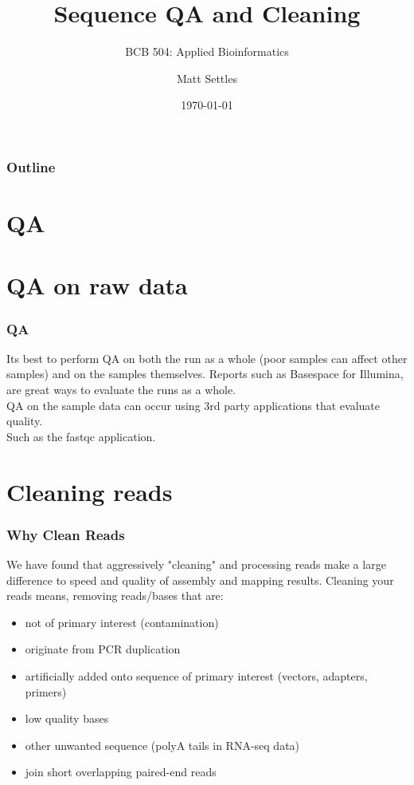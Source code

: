 \documentclass[pdf]{beamer}
\begin{document}
\title[Sequence Mapping]{Sequence QA and Cleaning}
\subtitle{BCB 504: Applied Bioinformatics\\}
\author[Matt Settles]{Matt Settles}
\date{\today}


\begin{frame}[plain]
  \titlepage
\end{frame}


\begin{frame}[plain] 
  \frametitle{Outline}
  \tableofcontents
\end{frame}

\section{QA}
\section{QA on raw data}
\begin{frame}
\frametitle{QA}
Its best to perform QA on both the run as a whole (poor samples can affect other samples) and on the samples themselves. Reports such as Basespace for Illumina,  are great ways to evaluate the runs as a whole.\\
\vspace{0.2in}
QA on the sample data can occur using 3rd party applications that evaluate quality.\\
Such as the fastqc application.\\
\end{frame}


\section{Cleaning reads}

\begin{frame}
\frametitle{Why Clean Reads}
We have found that aggressively "cleaning" and processing reads make a large difference to speed and quality of assembly and mapping results.
\vspace{0.2in}
Cleaning your reads means, removing reads/bases that are:
\begin{itemize}
\item not of primary interest (contamination)
\item originate from PCR duplication
\item artificially added onto sequence of primary interest (vectors, adapters, primers)
\item low quality bases
\item other unwanted sequence (polyA tails in RNA-seq data)
\item join short overlapping paired-end reads
\end{itemize}

\end{frame}
\end{document}
